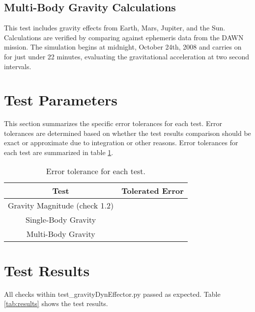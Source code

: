 \subsection{Multi-Body Gravity Calculations} This test includes gravity effects from Earth, Mars, Jupiter, and the Sun. Calculations are verified by comparing against ephemeris data from the DAWN mission. The simulation begins at midnight, October 24th, 2008 and carries on for just under 22 minutes, evaluating the gravitational acceleration at two second intervals.

\section{Test Parameters}

This section summarizes the  specific error tolerances for each test. Error tolerances are determined based on whether the test results comparison should be exact or approximate due to integration or other reasons. Error tolerances for each test are summarized in table \ref{tab:errortol}. \\

\begin{table}[htbp]
	\caption{Error tolerance for each test.}
	\label{tab:errortol}
	\centering \fontsize{10}{10}\selectfont
	\begin{tabular}{ c | c } %
		\hline
		\textbf{Test}   							    & \textbf{Tolerated Error} 						  \\ \hline
		Gravity Magnitude (check 1.2)        & 		   \\ \hline
		Single-Body Gravity						   & 														   \\ \hline
		Multi-Body Gravity 						   & 	 		       \\ \hline
	\end{tabular}
\end{table}

\section{Test Results}

All checks within test\_gravityDynEffector.py passed as expected. Table \ref{tab:results} shows the test results.\\

